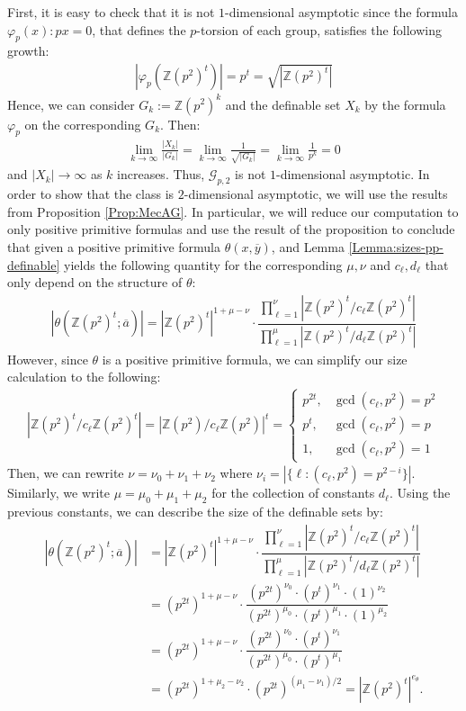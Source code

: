 \documentclass[10pt,a4paper]{amsart}
\theoremstyle{definition}
\newcommand{\Z}{\mathbb{Z}}
\newcommand{\ov}[1]{\overline{#1}}
\begin{document}
First, it is easy to check that it is not $1$-dimensional asymptotic since the formula $\varphi_p(x):px=0$, that defines the $p$-torsion of each group, satisfies the following growth:
\begin{align*}
    \left|\varphi_p\left(\Z(p^2)^t\right)\right| = p^t = \sqrt{|\Z(p^2)^t|}
\end{align*}
Hence, we can consider $G_k:=\Z(p^2)^k$ and the definable set $X_k$ by the formula $\varphi_p$ on the corresponding $G_k$. Then:
\begin{align*}
    \lim\limits_{k\to\infty}\frac{|X_k|}{|G_k|}=\lim\limits_{k\to\infty}\frac{1}{\sqrt{|G_k|}}=\lim\limits_{k\to\infty}\frac{1}{p^k}=0
\end{align*}
and $|X_k|\to\infty$ as $k$ increases. Thus, $\mathcal{G}_{p,2}$ is not $1$-dimensional asymptotic. In order to show that the class is $2$-dimensional asymptotic, we will use the results from Proposition \ref{Prop:MecAG}. In particular, we will reduce our computation to only positive primitive formulas and use the result of the proposition to conclude that given a positive primitive formula $\theta(x,\overline{y})$, and Lemma \ref{Lemma:sizes-pp-definable} yields the following quantity for the corresponding $\mu,\nu$ and $c_\ell,d_\ell$ that only depend on the structure of $\theta$:
\begin{align*}
    |\theta(\Z(p^2)^t;\ov{a})|=|\Z(p^2)^t|^{1+\mu-\nu}\cdot \dfrac{\prod_{\ell=1}^\nu |\Z(p^2)^t/c_\ell \Z(p^2)^t|}{\prod_{\ell=1}^\mu|\Z(p^2)^t/d_\ell \Z(p^2)^t|}
\end{align*}
However, since $\theta$ is a positive primitive formula, we can simplify our size calculation to the following:
\begin{align*}
    |\Z(p^2)^t/c_\ell \Z(p^2)^t| = |\Z(p^2)/c_\ell \Z(p^2)|^t  = \begin{cases}
        p^{2t}, & \gcd(c_\ell,p^2)=p^2\\
        p^t, & \gcd(c_\ell,p^2)=p\\
        1, & \gcd(c_\ell,p^2)=1
    \end{cases}
\end{align*}
Then, we can rewrite $\nu = \nu_0+\nu_1+\nu_2$ where $\nu_i=\left|\{\ell:(c_\ell,p^2)=p^{2-i}\}\right|$. Similarly, we write $\mu=\mu_0+\mu_1+\mu_2$ for the collection of constants $d_\ell$. Using the previous constants, we can describe the size of the definable sets by:
\begin{align*}
    |\theta(\Z(p^2)^t;\ov{a})|&=|\Z(p^2)^t|^{1+\mu-\nu}\cdot \dfrac{\prod_{\ell=1}^\nu |\Z(p^2)^t/c_\ell \Z(p^2)^t|}{\prod_{\ell=1}^\mu|\Z(p^2)^t/d_\ell \Z(p^2)^t|}\\
    &=(p^{2t})^{1+\mu-\nu}\cdot \dfrac{(p^{2t})^{\nu_0}\cdot(p^{t})^{\nu_1}\cdot(1)^{\nu_2}}{(p^{2t})^{\mu_0}\cdot(p^{t})^{\mu_1}\cdot(1)^{\mu_2}}\\
    &=(p^{2t})^{1+\mu-\nu}\cdot \dfrac{(p^{2t})^{\nu_0}\cdot(p^{t})^{\nu_1}}{(p^{2t})^{\mu_0}\cdot(p^{t})^{\mu_1}}\\
    &=(p^{2t})^{1+\mu_2-\nu_2}\cdot (p^{2t})^{(\mu_1-\nu_1)/2}=|\Z(p^2)^t|^{e_{\theta}}.
\end{align*}
\end{document}
